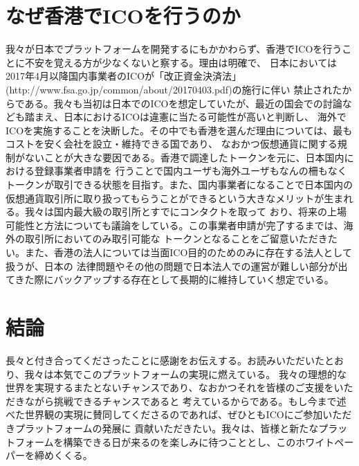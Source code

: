 \documentclass{jsarticle}
\begin{document}
\section{なぜ香港でICOを行うのか}
我々が日本でプラットフォームを開発するにもかかわらず、香港でICOを行うことに不安を覚える方が少なくないと察する。理由は明確で、
日本においては2017年4月以降国内事業者のICOが「改正資金決済法」(http://www.fsa.go.jp/common/about/20170403.pdf)の施行に伴い
禁止されたからである。我々も当初は日本でのICOを想定していたが、最近の国会での討論なども踏まえ、日本におけるICOは違憲に当たる可能性が高いと判断し、
海外でICOを実施することを決断した。その中でも香港を選んだ理由については、最もコストを安く会社を設立・維持できる国であり、
なおかつ仮想通貨に関する規制がないことが大きな要因である。香港で調達したトークンを元に、日本国内における登録事業者申請を
行うことで国内ユーザも海外ユーザもなんの柵もなくトークンが取引できる状態を目指す。また、国内事業者になることで日本国内の
仮想通貨取引所に取り扱ってもらうことができるという大きなメリットが生まれる。我々は国内最大級の取引所とすでにコンタクトを取って
おり、将来の上場可能性と方法についても議論をしている。この事業者申請が完了するまでは、海外の取引所においてのみ取引可能な
トークンとなることをご留意いただきたい。また、香港の法人については当面ICO目的のためのみに存在する法人として扱うが、日本の
法律問題やその他の問題で日本法人での運営が難しい部分が出てきた際にバックアップする存在として長期的に維持していく想定でいる。
\section{結論}
長々と付き合ってくださったことに感謝をお伝えする。お読みいただいたとおり、我々は本気でこのプラットフォームの実現に燃えている。
我々の理想的な世界を実現するまたとないチャンスであり、なおかつそれを皆様のご支援をいただきながら挑戦できるチャンスであると
考えているからである。もし今まで述べた世界観の実現に賛同してくださるのであれば、ぜひともICOにご参加いただきプラットフォームの発展に
貢献いただきたい。我々は、皆様と新たなプラットフォームを構築できる日が来るのを楽しみに待つこととし、このホワイトペーパーを締めくくる。
\end{document}
